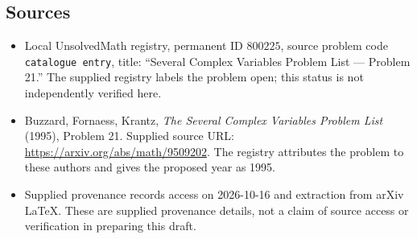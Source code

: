\documentclass[11pt]{article}
\begin{document}
\subsection{Sources}
\begin{itemize}
\item Local UnsolvedMath registry, permanent ID \(800225\), source problem code \texttt{catalogue entry}, title: ``Several Complex Variables Problem List --- Problem 21.'' The supplied registry labels the problem open; this status is not independently verified here.
\item Buzzard, Fornaess, Krantz, \emph{The Several Complex Variables Problem List} (1995), Problem 21. Supplied source URL: \url{https://arxiv.org/abs/math/9509202}. The registry attributes the problem to these authors and gives the proposed year as 1995.
\item Supplied provenance records access on 2026-10-16 and extraction from arXiv LaTeX. These are supplied provenance details, not a claim of source access or verification in preparing this draft.
\end{itemize}
\end{document}
